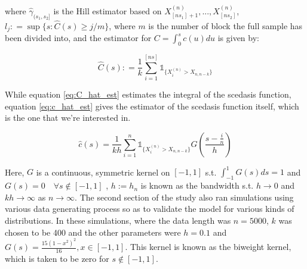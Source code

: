 \noindent where  $\hat{\gamma}_{(s_1,s_2]}$ is the Hill estimator based on $X_{[ns_1]+1}^{(n)}, ... , X_{[ns_2]}^{(n)}$,  $l_j : = \sup\{s: \hat{C}(s) \ge j/m\}$, where $m$ is the number of block the full sample has been divided into, and the estimator for $C = \int_0^s c(u) du $ is given by:


\begin{equation} \label{eq:C_hat_est}
\hat{C}(s) : = \frac{1}{k} \sum_{i=1}^{[ns]} \mathbb{1}_{\{X_i^{(n)} > X_{n,n-k}\}}
\end{equation}

While equation \ref{eq:C_hat_est} estimates the integral of the scedasis function, equation \ref{eq:c_hat_est} gives the estimator of the scedasis function itself, which is the one that we're interested in.

\begin{equation} \label{eq:c_hat_est}
\hat{c}(s) = \frac{1}{kh} \sum_{i=1}^n \mathbb{1}_{\{X_i^{(n)} > X_{n,n-k}\}}G(\frac{s-\frac{i}{n}}{h})
\end{equation}

Here, $G$ is a continuous, symmetric kernel on $[-1,1]$ s.t. $\int_{-1}^{1} G(s)ds = 1$ and $G(s) = 0 \quad \forall s \notin [-1,1]$ , $h := h_n$ is known as the bandwidth s.t. $h \rightarrow 0$ and $kh \rightarrow \infty$ as $n \rightarrow \infty$. The second section of the study also ran simulations using various data generating process so as to validate the model for various kinds of distributions. In these simulations, where the data length was $n=5000$, $k$ was chosen to be 400 and the other parameters were $h = 0.1$ and $G(s) = \frac{15(1-x^2)^2}{16}, x \in [-1,1]$. This kernel is known as the biweight kernel, which is taken to be zero for $ s \notin [-1,1]$.


